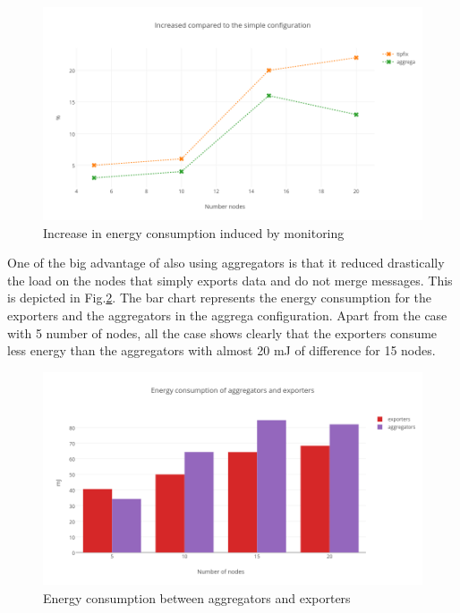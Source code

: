 \begin{figure}[h]
  \includegraphics[width=\textwidth]{res/increase_energy.png}
  \caption{Increase in energy consumption induced by monitoring}
  \label{fig:increase_energy}
\end{figure}

One of the big advantage of also using aggregators is that it reduced drastically the load on the nodes that simply exports data and do not merge messages. This is depicted in Fig.\ref{fig:aggrega_energy}. The bar chart represents the energy consumption for the exporters and the aggregators in the aggrega configuration. Apart from the case with 5 number of nodes, all the case shows clearly that the exporters consume less energy than the aggregators with almost 20 mJ of difference for 15 nodes.\\

\begin{figure}[h]
  \includegraphics[width=\textwidth]{res/energy_aggrega}
  \caption{Energy consumption between aggregators and exporters}
  \label{fig:aggrega_energy}
\end{figure}

